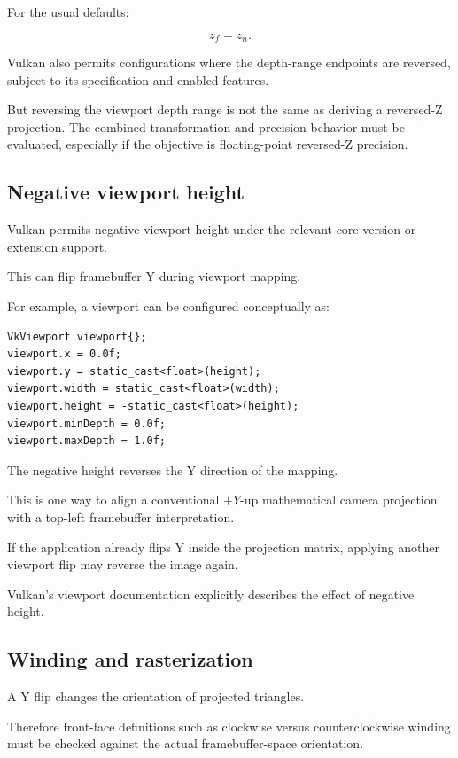 For the usual defaults:

\[
 z_f=z_n.
\]

Vulkan also permits configurations where the depth-range endpoints are reversed, subject to its specification and enabled features.

But reversing the viewport depth range is not the same as deriving a reversed-Z projection. The combined transformation and precision behavior must be evaluated, especially if the objective is floating-point reversed-Z precision.

\subsection{Negative viewport height}\label{02-foundations-ii-ch033-negative-viewport-height}

Vulkan permits negative viewport height under the relevant core-version or extension support.

This can flip framebuffer Y during viewport mapping.

For example, a viewport can be configured conceptually as:

\begin{verbatim}
VkViewport viewport{};
viewport.x = 0.0f;
viewport.y = static_cast<float>(height);
viewport.width = static_cast<float>(width);
viewport.height = -static_cast<float>(height);
viewport.minDepth = 0.0f;
viewport.maxDepth = 1.0f;
\end{verbatim}

The negative height reverses the Y direction of the mapping.

This is one way to align a conventional \(+Y\)-up mathematical camera projection with a top-left framebuffer interpretation.

If the application already flips Y inside the projection matrix, applying another viewport flip may reverse the image again.

Vulkan's viewport documentation explicitly describes the effect of negative height. 

\subsection{Winding and rasterization}\label{02-foundations-ii-ch033-winding-and-rasterization}

A Y flip changes the orientation of projected triangles.

Therefore front-face definitions such as clockwise versus counterclockwise winding must be checked against the actual framebuffer-space orientation.

